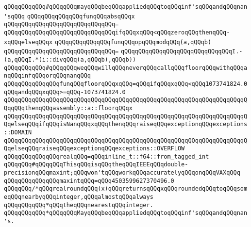 \newline
\verb|qQQqqQQqqQQq#qQQqqQQqmayqQQqbeqQQqappliedqQQqtoqQQqinf'sqQQqandqQQqnan'sqQQq|\newline
\verb|qQQqqQQqqQQqqQQqfunqQQqabsqQQqx|\newline
\verb|qQQqqQQqqQQqqQQqqQQqqQQqqQQqqQQq=|\newline
\verb|qQQqqQQqqQQqqQQqqQQqqQQqqQQqqQQqifqQQqxqQQq<qQQqzeroqQQqthenqQQq-xqQQqelseqQQqx|\newline
\newline
\verb|qQQqqQQqqQQqqQQqfunqQQqopqQQqmodqQQq(a,qQQqb)|\newline
\verb|qQQqqQQqqQQqqQQqqQQqqQQqqQQqqQQq=|\newline
\verb|qQQqqQQqqQQqqQQqqQQqqQQqqQQqqQQqI.-(a,qQQqI.*(i::divqQQq(a,qQQqb),qQQqb))|\newline
\newline
\verb|qQQqqQQqqQQq#qQQqqQQqweqQQqwillqQQqneverqQQqcallqQQqfloorqQQqwithqQQqanqQQqinfqQQqorqQQqnanqQQq|\newline
\verb|qQQqqQQqqQQqqQQqfunqQQqfloorqQQqxqQQq=qQQqifqQQqxqQQq<qQQq1073741824.0qQQqandqQQqxqQQq>=qQQq-1073741824.0|\newline
\verb|qQQqqQQqqQQqqQQqqQQqqQQqqQQqqQQqqQQqqQQqqQQqqQQqqQQqqQQqqQQqqQQqqQQqqQQqqQQqthenqQQqassembly::a::floorqQQqx|\newline
\verb|qQQqqQQqqQQqqQQqqQQqqQQqqQQqqQQqqQQqqQQqqQQqqQQqqQQqqQQqqQQqqQQqqQQqqQQqelseqQQqifqQQqisNanqQQqxqQQqthenqQQqraiseqQQqexceptionqQQqexceptions::DOMAIN|\newline
\verb|qQQqqQQqqQQqqQQqqQQqqQQqqQQqqQQqqQQqqQQqqQQqqQQqqQQqqQQqqQQqqQQqqQQqqQQqelseqQQqraiseqQQqexceptionqQQqexceptions::OVERFLOW|\newline
\verb|qQQqqQQqqQQqqQQqrealqQQq=qQQqinline_t::f64::from_tagged_int|\newline
\newline
\verb|qQQqqQQq#qQQqqQQqThisqQQqisqQQqtheqQQqIEEEqQQqdouble-precisionqQQqmaxint;qQQqwon'tqQQqworkqQQqaccuratelyqQQqonqQQqVAXqQQq|\newline
\verb|qQQqqQQqqQQqqQQqmaxintqQQq=qQQq4503599627370496.0|\newline
\newline
\verb|qQQqqQQq/*qQQqrealroundqQQq(x)qQQqreturnsqQQqxqQQqroundedqQQqtoqQQqsomeqQQqnearbyqQQqinteger,qQQqalmostqQQqalways|\newline
\verb|qQQqqQQqqQQq*qQQqtheqQQqnearestqQQqinteger.|\newline
\verb|qQQqqQQqqQQq*qQQqqQQqMayqQQqbeqQQqappliedqQQqtoqQQqinf'sqQQqandqQQqnan's.|\newline
